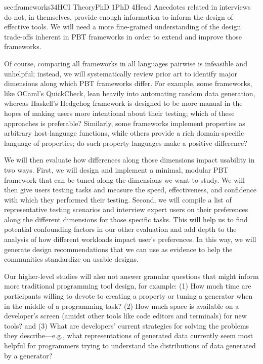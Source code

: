 %
  {sec:frameworks}{3}{4}{HCI Theory}{PhD
1}{PhD 4}{Head}
%
Anecdotes related in interviews do not, in themselves, provide enough
information to inform the design of effective tools.  We will need a more
fine-grained understanding of the design trade-offs inherent in PBT frameworks
in order to extend and improve those frameworks.

Of course, comparing all frameworks in all languages pairwise is infeasible and
unhelpful; instead, we will systematically review prior art to identify major
dimensions along which PBT frameworks differ. For example, some frameworks, like
OCaml's QuickCheck, lean heavily into automating random data generation, whereas
Haskell's Hedgehog framework is designed to be more manual in the hopes of
making users more intentional about their testing; which of these approaches is
preferable? Similarly, some frameworks implement properties as arbitrary
host-language functions, while others provide a rich domain-specific language of
properties; do such property languages make a positive difference?

We will then evaluate how differences along those dimensions impact usability in
two ways. First, we will design and implement a minimal, modular PBT framework
that can be tuned along the dimensions we want to study.  \iflater{}\fi We will
then give users testing tasks and measure the speed, effectiveness, and
confidence with which they performed their testing.  Second, we will compile a
list of representative testing scenarios and interview expert users on their
preferences along the different dimensions for those specific tasks. This will
help us to find potential confounding factors in our other evaluation and add
depth to the analysis of how different workloads impact user's preferences.  In
this way, we will generate design recommendations that we can use as evidence to
help the communities standardize on usable designs.

%
Our higher-level studies will also not answer granular questions that might
inform more traditional programming tool design, for example:
(1) How much time
are participants willing to devote to
creating a property or tuning a generator when in the
middle of a programming task?
(2) How much space is available on a developer's
screen (amidst other tools like code editors and terminals) for
new
tools? and
(3) What are developers' current strategies for solving the
problems they describe---e.g., what representations of generated data
currently seem most helpful
for programmers trying to understand the distributions of data generated by a
generator?

